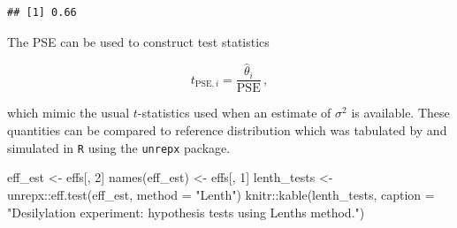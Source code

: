 \documentclass[
]{book}
\newenvironment{Shaded}{\begin{snugshade}}{\end{snugshade}}
\newcommand{\AttributeTok}[1]{\textcolor[rgb]{0.77,0.63,0.00}{#1}}
\newcommand{\DecValTok}[1]{\textcolor[rgb]{0.00,0.00,0.81}{#1}}
\newcommand{\FunctionTok}[1]{\textcolor[rgb]{0.00,0.00,0.00}{#1}}
\newcommand{\NormalTok}[1]{#1}
\newcommand{\OtherTok}[1]{\textcolor[rgb]{0.56,0.35,0.01}{#1}}
\newcommand{\SpecialCharTok}[1]{\textcolor[rgb]{0.00,0.00,0.00}{#1}}
\newcommand{\StringTok}[1]{\textcolor[rgb]{0.31,0.60,0.02}{#1}}
\theoremstyle{definition}
\theoremstyle{definition}
\theoremstyle{definition}
\theoremstyle{definition}
\theoremstyle{remark}
\begin{document}
\begin{verbatim}
## [1] 0.66
\end{verbatim}

The PSE can be used to construct test statistics

\[
t_{\mbox{PSE}, i} = \frac{\hat{\theta}_i}{\mbox{PSE}}\,,
\]

which mimic the usual \(t\)-statistics used when an estimate of \(\sigma^2\) is available. These quantities can be compared to reference distribution which was tabulated by \citet{Lenth1989} and simulated in \texttt{R} using the \texttt{unrepx} package.

\begin{Shaded}
\begin{Highlighting}[]
\NormalTok{eff\_est }\OtherTok{\textless{}{-}}\NormalTok{ effs[, }\DecValTok{2}\NormalTok{]}
\FunctionTok{names}\NormalTok{(eff\_est) }\OtherTok{\textless{}{-}}\NormalTok{ effs[, }\DecValTok{1}\NormalTok{]}
\NormalTok{lenth\_tests }\OtherTok{\textless{}{-}}\NormalTok{ unrepx}\SpecialCharTok{::}\FunctionTok{eff.test}\NormalTok{(eff\_est, }\AttributeTok{method =} \StringTok{"Lenth"}\NormalTok{)}
\NormalTok{knitr}\SpecialCharTok{::}\FunctionTok{kable}\NormalTok{(lenth\_tests, }\AttributeTok{caption =} \StringTok{"Desilylation experiment: hypothesis tests using Lenth\textquotesingle{}s method."}\NormalTok{)}
\end{Highlighting}
\end{Shaded}
\end{document}
